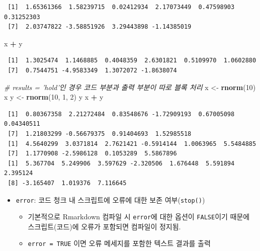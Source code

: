 \documentclass[
  11pt,
]{krantz}
\newenvironment{Shaded}{\begin{snugshade}}{\end{snugshade}}
\newcommand{\CommentTok}[1]{\textcolor[rgb]{0.37,0.37,0.37}{\textit{#1}}}
\newcommand{\DecValTok}[1]{\textcolor[rgb]{0.06,0.06,0.06}{#1}}
\newcommand{\KeywordTok}[1]{\textcolor[rgb]{0.27,0.27,0.27}{\textbf{#1}}}
\newcommand{\NormalTok}[1]{#1}
\newcommand{\OperatorTok}[1]{\textcolor[rgb]{0.43,0.43,0.43}{\textbf{#1}}}
\newcommand{\StringTok}[1]{\textcolor[rgb]{0.5,0.5,0.5}{#1}}
\providecommand{\tightlist}{%
  \setlength{\itemsep}{0pt}\setlength{\parskip}{0pt}}
\begin{document}
\begin{verbatim}
 [1]  1.65361366  1.58239715  0.02412934  2.17073449  0.47598903  0.31252303
 [7]  2.03747822 -3.58851926  3.29443898 -1.14385019
\end{verbatim}

\begin{Shaded}
\begin{Highlighting}[]
\NormalTok{x }\OperatorTok{+}\StringTok{ }\NormalTok{y}
\end{Highlighting}
\end{Shaded}

\begin{verbatim}
 [1]  1.3025474  1.1468885  0.4048359  2.6301821  0.5109970  1.0602880
 [7]  0.7544751 -4.9583349  1.3072072 -1.8638074
\end{verbatim}

\normalsize

\footnotesize

\begin{Shaded}
\begin{Highlighting}[]
\CommentTok{# results = 'hold'인 경우 코드 부분과 출력 부분이 따로 블록 처리}
\NormalTok{x <-}\StringTok{ }\KeywordTok{rnorm}\NormalTok{(}\DecValTok{10}\NormalTok{)}
\NormalTok{x}
\NormalTok{y <-}\StringTok{ }\KeywordTok{rnorm}\NormalTok{(}\DecValTok{10}\NormalTok{, }\DecValTok{1}\NormalTok{, }\DecValTok{2}\NormalTok{)}
\NormalTok{y}
\NormalTok{x }\OperatorTok{+}\StringTok{ }\NormalTok{y}
\end{Highlighting}
\end{Shaded}

\begin{verbatim}
 [1]  0.80367358  2.21272484  0.83548676 -1.72909193  0.67005098  0.04340511
 [7]  1.21803299 -0.56679375  0.91404693  1.52985518
 [1]  4.5640299  3.0371814  2.7621421 -0.5914144  1.0063965  5.5484885
 [7]  1.1770908 -2.5986128  0.1053289  5.5867896
 [1]  5.367704  5.249906  3.597629 -2.320506  1.676448  5.591894  2.395124
 [8] -3.165407  1.019376  7.116645
\end{verbatim}

\normalsize

\begin{itemize}
\tightlist
\item
  \texttt{error}: 코드 청크 내 스크립트에 오류에 대한 보존 여부(\texttt{stop()})

  \begin{itemize}
  \tightlist
  \item
    기본적으로 Rmarkdown 컴파일 시 \texttt{error}에 대한 옵션이 \texttt{FALSE}이기 때문에 스크립트(코드)에 오류가 포함되면 컴파일이 정지됨.
  \item
    \texttt{error\ =\ TRUE} 이면 오류 메세지를 포함한 텍스트 결과를 출력
  \end{itemize}
\end{itemize}
\end{document}
